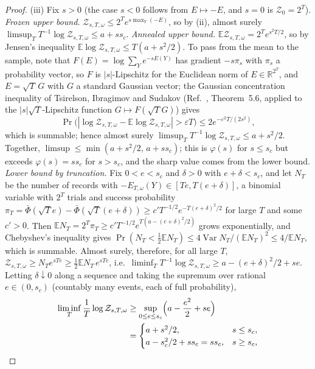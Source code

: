 \documentclass[aps,prx,reprint,superscriptaddress,nobibnotes,longbibliography]{revtex4-2}
\theoremstyle{remark}
\newcommand{\E}{\mathbb E}
\begin{document}
\begin{proof}
(iii) Fix $s>0$ (the case $s<0$ follows from $E\mapsto-E$, and $s=0$ is $\mathcal Z_0=2^T$).  \emph{Frozen upper bound.}  $\mathcal Z_{s,T,\omega}\le2^Te^{s\max_Y(-E)}$, so by (ii), almost surely $\limsup_TT^{-1}\log\mathcal Z_{s,T,\omega}\le a+ss_c$.  \emph{Annealed upper bound.}  $\E\mathcal Z_{s,T,\omega}=2^Te^{s^2T/2}$, so by Jensen's inequality $\E\log\mathcal Z_{s,T,\omega}\le T(a+s^2/2)$.  To pass from the mean to the sample, note that $F(E)=\log\sum_Ye^{-sE(Y)}$ has gradient $-s\pi_s$ with $\pi_s$ a probability vector, so $F$ is $|s|$-Lipschitz for the Euclidean norm of $E\in\mathbb R^{2^T}$, and $E=\sqrt T\,G$ with $G$ a standard Gaussian vector; the Gaussian concentration inequality of Tsirelson, Ibragimov and Sudakov (Ref.~\cite{BLM2013}, Theorem~5.6, applied to the $|s|\sqrt T$-Lipschitz function $G\mapsto F(\sqrt TG)$) gives
\begin{equation}
 \Pr\bigl(|\log\mathcal Z_{s,T,\omega}-\E\log\mathcal Z_{s,T,\omega}|>\varepsilon T\bigr)\le2e^{-\varepsilon^2T/(2s^2)},
 \label{eq:remconc}
\end{equation}
which is summable; hence almost surely $\limsup_TT^{-1}\log\mathcal Z_{s,T,\omega}\le a+s^2/2$.  Together, $\limsup\le\min(a+s^2/2,\,a+ss_c)$; this is $\varphi(s)$ for $s\le s_c$ but exceeds $\varphi(s)=ss_c$ for $s>s_c$, and the sharp value comes from the lower bound.  \emph{Lower bound by truncation.}  Fix $0<e<s_c$ and $\delta>0$ with $e+\delta<s_c$, and let $N_T$ be the number of records with $-E_{T,\omega}(Y)\in[Te,T(e+\delta)]$, a binomial variable with $2^T$ trials and success probability $\pi_T=\bar\Phi(\sqrt Te)-\bar\Phi(\sqrt T(e+\delta))\ge c'T^{-1/2}e^{-T(e+\delta)^2/2}$ for large $T$ and some $c'>0$.  Then $\E N_T=2^T\pi_T\ge c'T^{-1/2}e^{T(a-(e+\delta)^2/2)}$ grows exponentially, and Chebyshev's inequality gives $\Pr(N_T<\tfrac12\E N_T)\le4\operatorname{Var}N_T/(\E N_T)^2\le4/\E N_T$, which is summable.  Almost surely, therefore, for all large $T$, $\mathcal Z_{s,T,\omega}\ge N_Te^{sTe}\ge\tfrac12\E N_T\,e^{sTe}$, i.e.\ $\liminf_TT^{-1}\log\mathcal Z_{s,T,\omega}\ge a-(e+\delta)^2/2+se$.  Letting $\delta\downarrow0$ along a sequence and taking the supremum over rational $e\in(0,s_c)$ (countably many events, each of full probability),
\begin{align*}
 \liminf_T\frac1T\log\mathcal Z_{s,T,\omega}&\ge\sup_{0\le e\le s_c}\Bigl(a-\frac{e^2}2+se\Bigr)\\
 &=\begin{cases}a+s^2/2,&s\le s_c,\\ a-s_c^2/2+ss_c=ss_c,&s\ge s_c,\end{cases}

\end{align*}
\end{proof}
\end{document}
